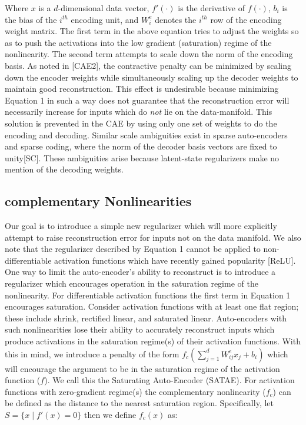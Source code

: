 \documentclass{article} %
\begin{document}
\noindent
Where $x$ is a $d$-dimensional data vector, $f'(\cdot)$ is the derivative of
$f(\cdot)$, $b_i$ is the bias of the $i^{th}$ encoding unit, and $W^e_i$
denotes the $i^{th}$ row of the encoding weight matrix. The first term in the
above equation tries to adjust the weights so as to push the activations into
the low gradient (saturation) regime of the nonlinearity. The second term
attempts to scale down the norm of the encoding basis. As noted in [CAE2], the
contractive penalty can be minimized by scaling down the encoder weights while
simultaneously scaling up the decoder weights to maintain good reconstruction.
This effect is undesirable because minimizing Equation 1 in such a way does not
guarantee that the reconstruction error will necessarily increase for inputs
which do \emph{not} lie on the data-manifold. This solution is prevented in the
CAE by using only one set of weights to do the encoding and decoding. Similar
scale ambiguities exist in sparse auto-encoders and sparse coding, where the
norm of the decoder basis vectors are fixed to unity[SC]. These ambiguities
arise because latent-state regularizers make no mention of the decoding
weights. 

\subsection{complementary Nonlinearities}     Our goal is to introduce a simple
new regularizer which will more explicitly attempt to raise reconstruction
error for inputs not on the data manifold.  We also note that the regularizer
described by Equation 1 cannot be applied to non-differentiable activation
functions which have recently gained popularity [ReLU]. One way to limit the
auto-encoder's ability to reconstruct is to introduce a regularizer which
encourages operation in the saturation regime of the nonlinearity. For
differentiable activation functions the first term in Equation 1 encourages
saturation. Consider activation functions with at least one flat region; these
include shrink, rectified linear, and saturated linear. Auto-encoders with such
nonlinearities lose their ability to accurately reconstruct inputs which
produce activations in the saturation regime(s) of their activation functions.
With this in mind, we introduce a penalty of the form $f_c(\sum_{j=1}^d
W^e_{ij}x_j + b_i)$ which will encourage the argument to be in the saturation
regime of the activation function ($f$). We call this the Saturating
Auto-Encoder (SATAE). For activation functions with zero-gradient regime(s) the
complementary nonlinearity ($f_c$) can be defined as the distance to the
nearest saturation region. Specifically, let $S = \{x \mid  f'(x) = 0\}$ then
we define $f_c(x)$ as: 
\end{document}
